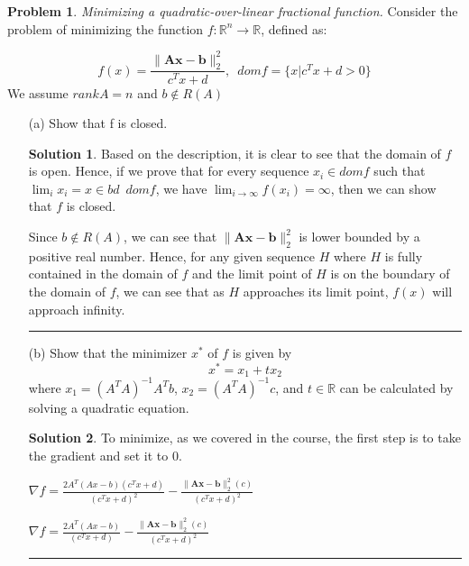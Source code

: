 \documentclass{article}
\theoremstyle{definition}
\newtheorem{problem}{Problem}
\def\fline{\rule{0.75\linewidth}{0.5pt}}
\newcommand{\finishline}{\begin{center}\fline\end{center}}
\newtheorem*{solution*}{Solution}
\newenvironment{solution}{\begin{solution*}}{{\finishline} \end{solution*}}
\begin{document}
\begin{problem}
    \textit{Minimizing a quadratic-over-linear fractional function.} Consider the problem of minimizing the function $f: \mathbb{R}^n \rightarrow \mathbb{R}$, defined as:

    \begin{equation}
                        \label{eq:example}
                            f(x) = \frac{\|\mathbf{Ax - b}\|^2_2}{c^Tx + d}, \enspace dom f = \{x | c^Tx + d > 0\}
                    \end{equation}
We assume $rank A = n$ and $b \notin R(A)$ 

\begin{enumerate}
    \item[(a)] Show that f is closed.
    \begin{solution}
        Based on the description, it is clear to see that the domain of $f$ is open. Hence, if we prove that for every sequence $x_i \in dom f$ such that $\lim_{i} x_i = x \in bd \enspace dom f$, we have $\lim_{i\to\infty} f(x_i) = \infty$, then we can show that $f$ is closed. \newline 

        Since $b \notin R(A)$, we can see that $\|\mathbf{Ax - b}\|^2_2$ is lower bounded by a positive real number. Hence, for any given sequence $H$ where $H$ is fully contained in the domain of $f$ and the limit point of $H$ is on the boundary of the domain of $f$, we can see that as $H$ approaches its limit point, $f(x)$ will approach infinity. 
    \end{solution}
    \item[(b)] Show that the minimizer $x^*$ of $f$ is given by 
    \begin{equation}
                        \label{eq:example}
                            x^* = x_1 + tx_2
                    \end{equation}
    where $x_1 = (A^TA)^{-1} A^Tb$, $x_2 = (A^TA)^{-1}c$, and $t \in \mathbb{R}$ can be calculated by solving a quadratic equation.

    \begin{solution}
        To minimize, as we covered in the course, the first step is to take the gradient and set it to 0. \newline 

        $\nabla f = \frac{2A^T (Ax - b)(c^Tx + d)}{(c^Tx + d) ^ 2} - \frac{\|\mathbf{Ax - b}\|^2_2 (c)}{(c^Tx + d) ^ 2}$ \newline 

        $\nabla f = \frac{2A^T (Ax - b)}{(c^Tx + d)} - \frac{\|\mathbf{Ax - b}\|^2_2 (c)}{(c^Tx + d) ^ 2}$ \newline 


\end{solution}
\end{enumerate}
\end{problem}
\end{document}
